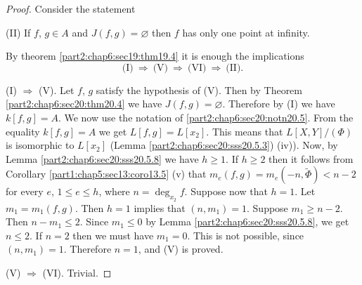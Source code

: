 \begin{proof}
  Consider the statement

  (II) If $f$, $g \in A$ and $J(f, g)= \diameter$ then $f$ has only
  one point at infinity. 

By theorem \ref{part2:chap6:sec19:thm19.4} it is enough the
implications
$$
\text{(I)}~ \Rightarrow~ \text{(V)}~ \Rightarrow ~\text{(VI)}~
\Rightarrow ~\text{(II)}. 
$$

(I) $\Rightarrow$ (V). Let $f$, $g$ satisfy the hypothesis of
(V). Then by Theorem \ref{part2:chap6:sec20:thm20.4} we have $J(f, g)=
\diameter$. Therefore by (I) we have $k[f, g]=A$. We now use the
notation of \ref{part2:chap6:sec20:notn20.5}. From the equality $k[f,
  g]= A$ we get $L[f, g]= L[x_2]$. This means that $L [X, Y]/(\Phi)$
is isomorphic to $L[x_2]$ (Lemma \ref{part2:chap6:sec20:sss20.5.3})
(iv)). Now, by Lemma \ref{part2:chap6:sec20:sss20.5.8} we have $h \geq
1$. If $h \geq 2$ then it follows from
Corollary \ref{part1:chap5:sec13:coro13.5} (v)  that $m_e (f, g)= m_e
(-n, \tilde{\Phi})< n-2$ for every $e$, $1 \leq e \leq h$, where $n=
\deg_{x_2} f$. Suppose now that $h=1$. Let $m_1= m_1(f, g)$. Then
$h=1$ implies that  \gcd\pageoriginale $(n, m_1)=1$. Suppose $m_1 \geq n-2$. Then $n
- m_1 \leq 2$. Since $m_1 \leq 0$ by Lemma
\ref{part2:chap6:sec20:sss20.5.8}, we get $n \leq 2$. If $n=2$ then we
must have $m_1 = 0$. This is not possible, since  \gcd $(n,
m_1)=1$. Therefore $n=1$, and (V) is proved.

(V) $\Rightarrow$ (VI). Trivial.


\end{proof}
